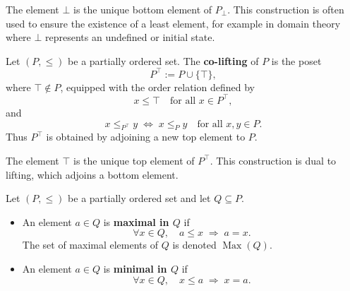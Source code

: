 \begin{remark}
The element $\bot$ is the unique bottom element of $P_{\bot}$. This construction is often used to ensure the existence of a least element, for example in domain theory where $\bot$ represents an undefined or initial state.
\end{remark}


\begin{definition}[Co-Lifting]
Let $(P,\le)$ be a partially ordered set. The \textbf{co-lifting} of $P$ is the poset
\[
P^{\top} := P \cup \{\top\},
\]
where $\top \notin P$, equipped with the order relation defined by
\[
x \le \top \quad \text{for all } x \in P^{\top},
\]
and
\[
x \le_{P^{\top}} y
\;\Longleftrightarrow\;
x \le_P y
\quad \text{for all } x,y \in P.
\]
Thus $P^{\top}$ is obtained by adjoining a new top element to $P$.
\end{definition}

\begin{remark}
The element $\top$ is the unique top element of $P^{\top}$. This construction is dual to lifting, which adjoins a bottom element.
\end{remark}



\begin{definition}
Let $(P,\le)$ be a partially ordered set and let $Q \subseteq P$.

\begin{itemize}
    \item An element $a \in Q$ is \textbf{maximal in $Q$} if
    \[
    \forall x \in Q, \quad a \le x \;\Longrightarrow\; a = x.
    \]
    The set of maximal elements of $Q$ is denoted $\operatorname{Max}(Q)$.

    \item An element $a \in Q$ is \textbf{minimal in $Q$} if
    \[
    \forall x \in Q, \quad x \le a \;\Longrightarrow\; x = a.
    \]
\end{itemize}
\end{definition}

